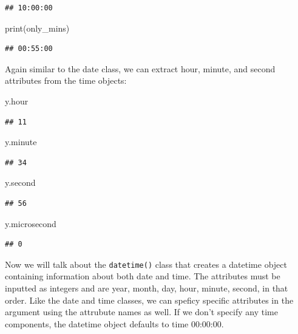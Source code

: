 \documentclass[
]{book}
\newenvironment{Shaded}{\begin{snugshade}}{\end{snugshade}}
\newcommand{\BuiltInTok}[1]{#1}
\newcommand{\NormalTok}[1]{#1}
\begin{document}
\begin{verbatim}
## 10:00:00
\end{verbatim}

\begin{Shaded}
\begin{Highlighting}[]
\BuiltInTok{print}\NormalTok{(only\_mins)}
\end{Highlighting}
\end{Shaded}

\begin{verbatim}
## 00:55:00
\end{verbatim}

Again similar to the date class, we can extract hour, minute, and second attributes from the time objects:

\begin{Shaded}
\begin{Highlighting}[]
\NormalTok{y.hour}
\end{Highlighting}
\end{Shaded}

\begin{verbatim}
## 11
\end{verbatim}

\begin{Shaded}
\begin{Highlighting}[]
\NormalTok{y.minute}
\end{Highlighting}
\end{Shaded}

\begin{verbatim}
## 34
\end{verbatim}

\begin{Shaded}
\begin{Highlighting}[]
\NormalTok{y.second}
\end{Highlighting}
\end{Shaded}

\begin{verbatim}
## 56
\end{verbatim}

\begin{Shaded}
\begin{Highlighting}[]
\NormalTok{y.microsecond}
\end{Highlighting}
\end{Shaded}

\begin{verbatim}
## 0
\end{verbatim}

Now we will talk about the \texttt{datetime()} class that creates a datetime object containing information about both date and time. The attributes must be inputted as integers and are year, month, day, hour, minute, second, in that order. Like the date and time classes, we can speficy specific attributes in the argument using the attrubute names as well. If we don't specify any time components, the datetime object defaults to time 00:00:00.
\end{document}
